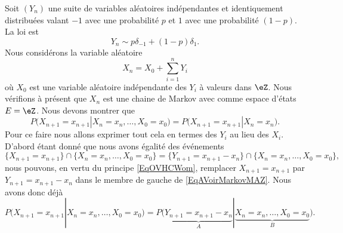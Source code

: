 Soit \( (Y_n)\) une suite de variables aléatoires indépendantes et identiquement distribuées valant \( -1\) avec une probabilité \( p\) et \( 1\) avec une probabilité \( (1-p)\). La loi est
\begin{equation}
	Y_n\sim p\delta_{-1}+(1-p)\delta_{1}.
\end{equation}
Nous considérons la variable aléatoire
\begin{equation}
	X_n=X_0+\sum_{i=1}^nY_i
\end{equation}
où \( X_0\) est une variable aléatoire indépendante des \( Y_i\) à valeurs dans \( \eZ\). Nous vérifions à présent que \( X_n\) est une chaine de Markov avec comme espace d'états \( E=\eZ\). Nous devons montrer que
\begin{equation}        \label{EqAVoirMarkovMAZ}
	P\big( X_{n+1}=x_{n+1}| X_n=x_n,\ldots,X_0=x_0 \big)=P\big( X_{n+1}=x_{n+1}|X_n=x_n \big).
\end{equation}
Pour ce faire nous allons exprimer tout cela en termes des \( Y_i\) au lieu des \( X_i\). D'abord étant donné que nous avons égalité des événements
\begin{equation}
	\{ X_{n+1}=x_{n+1} \}\cap\{ X_n=x_n,\ldots, X_0=x_0 \}= \{ Y_{n+1}=x_{n+1}-x_n \}\cap\{X_n=x_n,\ldots, X_0=x_0\},
\end{equation}
nous pouvons, en vertu du principe \eqref{EqOVHCWom}, remplacer \( X_{n+1}=x_{n+1}\) par \( Y_{n+1}=x_{n+1}-x_n\) dans le membre de gauche de \eqref{EqAVoirMarkovMAZ}. Nous avons donc déjà
\begin{equation}
	P\big( X_{n+1}=x_{n+1}| X_n=x_n,\ldots,X_0=x_0 \big)=P\big( \underbrace{Y_{n+1}=x_{n+1}-x_n}_{A}| \underbrace{X_n=x_n,\ldots,X_0=x_0}_{B} \big).
\end{equation}

